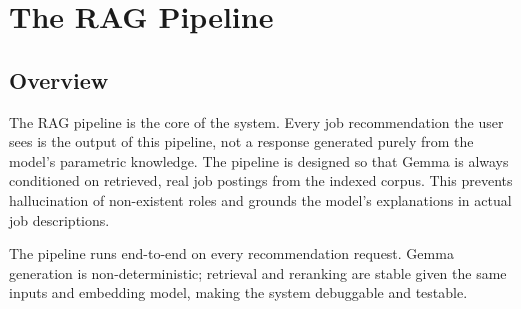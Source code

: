 \documentclass[11pt]{article}
\begin{document}
\section{The RAG Pipeline}

\subsection{Overview}

The RAG pipeline is the core of the system. Every job recommendation the user sees is the output of this pipeline, not a response generated purely from the model's parametric knowledge. The pipeline is designed so that Gemma is always conditioned on retrieved, real job postings from the indexed corpus. This prevents hallucination of non-existent roles and grounds the model's explanations in actual job descriptions.

The pipeline runs end-to-end on every recommendation request. Gemma generation is non-deterministic; retrieval and reranking are stable given the same inputs and embedding model, making the system debuggable and testable.
\end{document}
